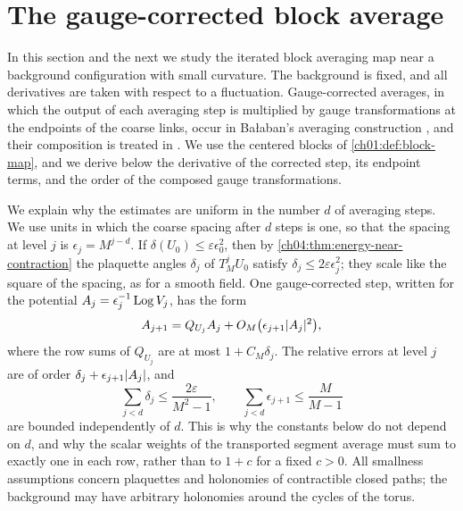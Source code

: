 \section{The gauge-corrected block average}\label{ch05:sec:corrected}

In this section and the next we study the iterated block averaging map near a background configuration with small curvature. The background is fixed, and all derivatives are taken with respect to a fluctuation. Gauge-corrected averages, in which the output of each averaging step is multiplied by gauge transformations at the endpoints of the coarse links, occur in Bałaban's averaging construction \cite[(61)--(63), p.~28]{Balaban1985Averaging}, and their composition is treated in \cite[(78)--(92), pp.~30--31; (97)--(100), p.~32]{Balaban1985Averaging}. We use the centered blocks of \cref{ch01:def:block-map}, and we derive below the derivative of the corrected step, its endpoint terms, and the order of the composed gauge transformations.

We explain why the estimates are uniform in the number $d$ of averaging steps. We use units in which the coarse spacing after $d$ steps is one, so that the spacing at level $j$ is $\epsilon_j=M^{j-d}$. If $\delta(U_0)\le\varepsilon\epsilon_0^2$, then by \cref{ch04:thm:energy-near-contraction} the plaquette angles $\delta_j$ of $T_M^jU_0$ satisfy $\delta_j\le2\varepsilon\epsilon_j^2$; they scale like the square of the spacing, as for a smooth field. One gauge-corrected step, written for the potential $A_j=\epsilon_j^{-1}\operatorname{Log} V_j$, has the form
\[
 A_{j+1}=Q_{U_j}A_j+O_M\bigl(\epsilon_{j+1}\lvert A_j\rvert^2\bigr),
\]
where the row sums of $Q_{U_j}$ are at most $1+C_M\delta_j$. The relative errors at level $j$ are of order $\delta_j+\epsilon_{j+1}\lvert A_j\rvert$, and
\[
 \sum_{j<d}\delta_j\le\frac{2\varepsilon}{M^2-1},\qquad\sum_{j<d}\epsilon_{j+1}\le\frac M{M-1}
\]
are bounded independently of $d$. This is why the constants below do not depend on $d$, and why the scalar weights of the transported segment average must sum to exactly one in each row, rather than to $1+c$ for a fixed $c>0$. All smallness assumptions concern plaquettes and holonomies of contractible closed paths; the background may have arbitrary holonomies around the cycles of the torus.

